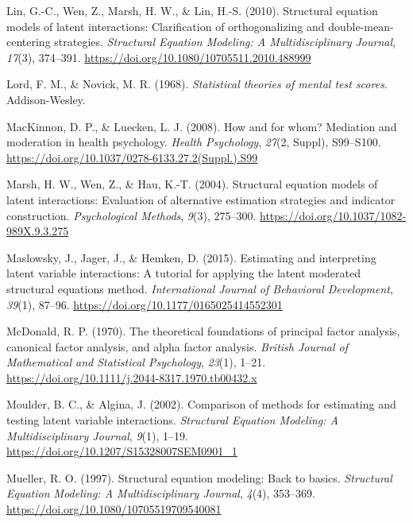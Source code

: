 \documentclass[
  man,mask]{apa6}
\newlength{\cslhangindent}
\newenvironment{CSLReferences}[2] %
 {\begin{list}{}{%
  \setlength{\itemindent}{0pt}
  \setlength{\leftmargin}{0pt}
  \setlength{\parsep}{0pt}
  \ifodd #1
   \setlength{\leftmargin}{\cslhangindent}
   \setlength{\itemindent}{-1\cslhangindent}
  \fi
  \setlength{\itemsep}{#2\baselineskip}}}
 {\end{list}}
\begin{document}
\begin{CSLReferences}{1}{0}
Lin, G.-C., Wen, Z., Marsh, H. W., \& Lin, H.-S. (2010). Structural equation models of latent interactions: {Clarification} of orthogonalizing and double-mean-centering strategies. \emph{Structural Equation Modeling: A Multidisciplinary Journal}, \emph{17}(3), 374--391. \url{https://doi.org/10.1080/10705511.2010.488999}

Lord, F. M., \& Novick, M. R. (1968). \emph{Statistical theories of mental test scores}. Addison-Wesley.

MacKinnon, D. P., \& Luecken, L. J. (2008). How and for whom? Mediation and moderation in health psychology. \emph{Health Psychology}, \emph{27}(2, Suppl), S99--S100. \url{https://doi.org/10.1037/0278-6133.27.2(Suppl.).S99}

Marsh, H. W., Wen, Z., \& Hau, K.-T. (2004). Structural equation models of latent interactions: Evaluation of alternative estimation strategies and indicator construction. \emph{Psychological Methods}, \emph{9}(3), 275--300. \url{https://doi.org/10.1037/1082-989X.9.3.275}

Maslowsky, J., Jager, J., \& Hemken, D. (2015). Estimating and interpreting latent variable interactions: A tutorial for applying the latent moderated structural equations method. \emph{International Journal of Behavioral Development}, \emph{39}(1), 87--96. \url{https://doi.org/10.1177/0165025414552301}

McDonald, R. P. (1970). The theoretical foundations of principal factor analysis, canonical factor analysis, and alpha factor analysis. \emph{British Journal of Mathematical and Statistical Psychology}, \emph{23}(1), 1--21. \url{https://doi.org/10.1111/j.2044-8317.1970.tb00432.x}

Moulder, B. C., \& Algina, J. (2002). Comparison of methods for estimating and testing latent variable interactions. \emph{Structural Equation Modeling: A Multidisciplinary Journal}, \emph{9}(1), 1--19. \url{https://doi.org/10.1207/S15328007SEM0901_1}

Mueller, R. O. (1997). Structural equation modeling: Back to basics. \emph{Structural Equation Modeling: A Multidisciplinary Journal}, \emph{4}(4), 353--369. \url{https://doi.org/10.1080/10705519709540081}


\end{CSLReferences}
\end{document}
